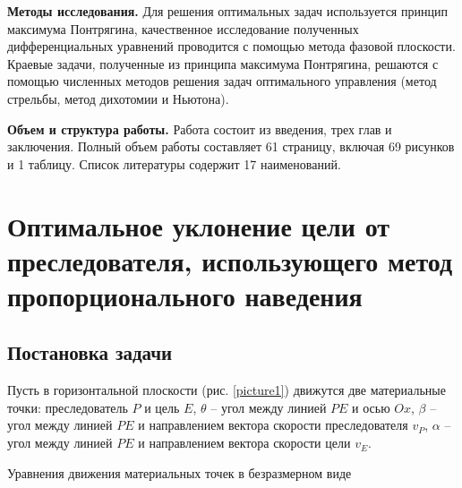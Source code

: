 \documentclass[a4paper,12pt, openany]{book}
\theoremstyle{plain} %
\theoremstyle{definition} %
\theoremstyle{remark} %
\numberwithin{equation}{chapter}
\begin{document}
{\textbf{Методы исследования.} Для решения оптимальных задач используется принцип максимума Понтрягина, качественное исследование полученных дифференциальных уравнений проводится с помощью метода фазовой плоскости. Краевые задачи, полученные из принципа максимума Понтрягина, решаются с помощью численных методов решения задач оптимального управления (метод стрельбы, метод дихотомии и Ньютона). 

\textbf{Объем и структура работы.} Работа состоит из введения, трех глав и заключения. Полный объем работы составляет 61 страницу, включая 69 рисунков и 1 таблицу. Список литературы содержит 17 наименований. 

\newpage

\chapter{Оптимальное уклонение цели от преследователя, использующего метод пропорционального наведения}

\section{Постановка задачи}

Пусть в горизонтальной плоскости (рис. \ref{picture1}) движутся две материальные точки:  преследователь $P$ и цель $E$, $\theta$ -- угол между линией $PE$ и осью $Ox$, $\beta$ -- угол между линией $PE$ и направлением вектора скорости преследователя $v_P$, $\alpha$ -- угол между линией $PE$ и направлением вектора скорости цели $v_E$. 





Уравнения движения материальных точек в безразмерном виде

}
\end{document}
